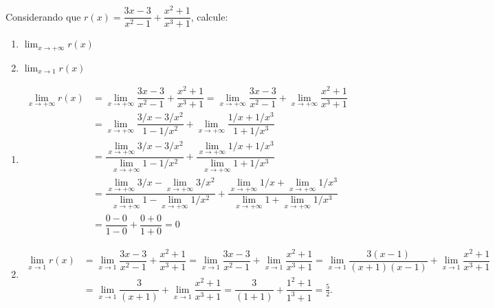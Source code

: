 \documentclass[12pt,a4paper]{article}
\begin{document}
\begin{ExerciseList}
\begin{enumerate}
\end{enumerate}
\Exercise[title={2,0}] Considerando que $r(x) = \dfrac{3x - 3}{x^2 - 1} + \dfrac{x^2 + 1}{x^3 + 1}$, calcule:
\begin{enumerate}
\item $\displaystyle \lim_{x \to +\infty} r(x)$
\item $\displaystyle \lim_{x \to 1} r(x)$
\end{enumerate}
\Answer
\begin{enumerate}
\item
\begin{align*}
\lim_{x \to +\infty} r(x)
& = \lim_{x \to +\infty} \dfrac{3x - 3}{x^2 - 1} + \dfrac{x^2 + 1}{x^3 + 1}
  = \lim_{x \to +\infty} \dfrac{3x - 3}{x^2 - 1}
+ \lim_{x \to +\infty} \dfrac{x^2 + 1}{x^3 + 1}\\
& = \lim_{x \to +\infty} \dfrac{3/x - 3/x^2}{1 - 1/x^2}
+ \lim_{x \to +\infty} \dfrac{1/x + 1/x^3}{1 + 1/x^3}\\
& = \dfrac{\lim_{x \to +\infty} 3/x - 3/x^2}{\lim_{x \to +\infty} 1 - 1/x^2}
+ \dfrac{\lim_{x \to +\infty} 1/x + 1/x^3}{\lim_{x \to +\infty} 1 + 1/x^3}\\
& = \dfrac{\lim_{x \to +\infty} 3/x - \lim_{x \to +\infty} 3/x^2}{\lim_{x \to +\infty} 1 - \lim_{x \to +\infty} 1/x^2}
+ \dfrac{\lim_{x \to +\infty} 1/x + \lim_{x \to +\infty} 1/x^3}{\lim_{x \to +\infty} 1 + \lim_{x \to +\infty} 1/x^3}\\
& = \dfrac{0 - 0}{1 - 0} + \dfrac{0 + 0}{1 + 0} = 0
\end{align*}
\item
\begin{align*}
\lim_{x \to 1} r(x)
& = \lim_{x \to 1} \dfrac{3x - 3}{x^2 - 1} + \dfrac{x^2 + 1}{x^3 + 1}
  = \lim_{x \to 1} \dfrac{3x - 3}{x^2 - 1} + \lim_{x \to 1} \dfrac{x^2 + 1}{x^3 + 1}
  = \lim_{x \to 1} \dfrac{3(x - 1)}{(x+1)(x-1) } + \lim_{x \to 1} \dfrac{x^2 + 1}{x^3 + 1}\\
&
  = \lim_{x \to 1} \dfrac{3}{(x+1) } + \lim_{x \to 1} \dfrac{x^2 + 1}{x^3 + 1}
  = \dfrac{3}{(1+1) } + \dfrac{1^2 + 1}{1^3 + 1} = \frac{5}{2}.
\end{align*}
\end{enumerate}


\end{ExerciseList}
\end{document}
